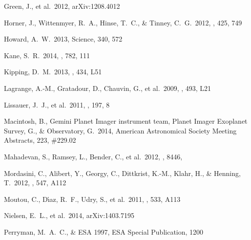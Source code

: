 \documentclass[11pt,preprint]{aastex}
\begin{document}
\begin{CJK*}{UTF8}{gbsn}
\begin{thebibliography}
 Green, J., et al.\ 2012, 
arXiv:1208.4012   %

 Horner, J., Wittenmyer, R.~A., 
Hinse, T.~C., \& Tinney, C.~G.\ 2012, \mnras, 425, 749 %

 Howard, A.~W.\ 2013, Science, 340,
  572 %

  
 Kane, S.~R.\ 2014, \apj, 782, 111 %
  
 Kipping, D.~M.\ 2013, \mnras,
  434, L51 %

 Lagrange, A.-M., Gratadour, D., Chauvin, G., et al.\ 2009, \aap, 493, L21 %

 Lissauer, J.~J., et al.\ 
2011, \apjs, 197, 8 %

 Macintosh, B., Gemini 
Planet Imager instrument team, Planet Imager Exoplanet Survey, G., 
\& Observatory, G.\ 2014, American Astronomical Society Meeting
Abstracts, 223, \#229.02  %


 Mahadevan, S., 
Ramsey, L., Bender, C., et al.\ 2012, \procspie, 8446, %

 Mordasini, C., Alibert, Y., 
Georgy, C., Dittkrist, K.-M., Klahr, H., \& Henning, T.\ 2012, \aap, 547, A112

 Moutou, C., D{\'{\i}}az, R.~F., Udry, S., et al.\ 2011, \aap, 533, A113  %

 Nielsen, E.~L., et al.\ 2014, 
arXiv:1403.7195 %
  
 Perryman, M.~A.~C., \&
  ESA 1997, ESA Special Publication, 1200 %


\end{thebibliography}
\end{CJK*}
\end{document}
